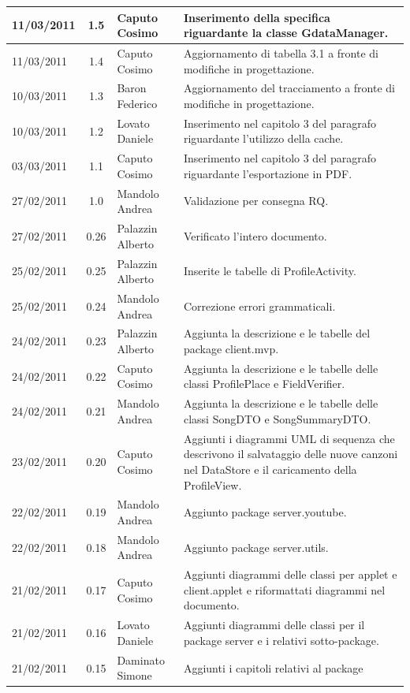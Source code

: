 \begin{longtable}{|p{}|c|p{}|p{}|}
\hline
11/03/2011 & 1.5 & Caputo Cosimo & Inserimento della specifica riguardante la
classe GdataManager.\\
\hline
11/03/2011 & 1.4 & Caputo Cosimo & Aggiornamento di tabella 3.1 a fronte di
modifiche in progettazione.\\
\hline
10/03/2011 & 1.3 & Baron Federico & Aggiornamento del tracciamento a fronte
di modifiche in progettazione.\\
\hline
10/03/2011 & 1.2 & Lovato Daniele & Inserimento nel capitolo 3 del paragrafo
riguardante l'utilizzo della cache.\\
\hline
03/03/2011 & 1.1 & Caputo Cosimo & Inserimento nel capitolo 3 del paragrafo
riguardante l'esportazione in PDF.\\
\hline
27/02/2011 & 1.0 & Mandolo Andrea & Validazione per consegna RQ.\\
\hline
27/02/2011 & 0.26 & Palazzin Alberto & Verificato l'intero documento.\\
\hline
25/02/2011 & 0.25 & Palazzin Alberto & Inserite le tabelle di ProfileActivity.\\
\hline
25/02/2011 & 0.24 & Mandolo Andrea & Correzione errori grammaticali.\\
\hline
24/02/2011 & 0.23 & Palazzin Alberto & Aggiunta la descrizione e le tabelle
del package client.mvp.\\
\hline
24/02/2011 & 0.22 & Caputo Cosimo & Aggiunta la descrizione e le tabelle
delle classi ProfilePlace e FieldVerifier.\\
\hline
24/02/2011 & 0.21 & Mandolo Andrea & Aggiunta la descrizione e le tabelle
delle classi SongDTO e SongSummaryDTO.\\
\hline
23/02/2011 & 0.20 & Caputo Cosimo & Aggiunti i diagrammi UML di sequenza
che descrivono il salvataggio delle nuove canzoni nel DataStore e il caricamento della ProfileView.\\
\hline
22/02/2011 & 0.19 & Mandolo Andrea & Aggiunto package server.youtube.\\
\hline
22/02/2011 & 0.18 & Mandolo Andrea & Aggiunto package server.utils.\\
\hline
21/02/2011 & 0.17 & Caputo Cosimo & Aggiunti diagrammi delle classi per applet
e client.applet e riformattati diagrammi nel documento.\\
\hline
21/02/2011 & 0.16 & Lovato Daniele & Aggiunti diagrammi delle classi per il
package server e i relativi sotto-package.\\
\hline
21/02/2011 & 0.15 & Daminato Simone & Aggiunti i capitoli relativi al package

\end{longtable}
